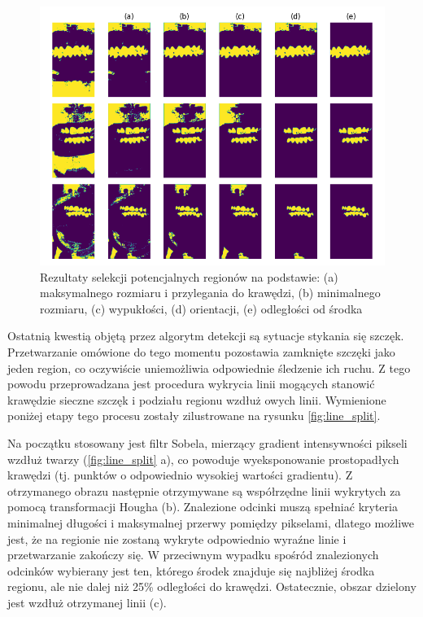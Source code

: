 \begin{figure}
    \centering \includegraphics[width=140mm]{figures/selection.png}
    \caption{Rezultaty selekcji potencjalnych regionów na podstawie: (a) maksymalnego rozmiaru i przylegania do krawędzi, (b) minimalnego rozmiaru, (c) wypukłości, (d) orientacji, (e) odległości od środka}
    \label{fig:selection}
\end{figure}

Ostatnią kwestią objętą przez algorytm detekcji są sytuacje stykania się szczęk. Przetwarzanie omówione do tego momentu pozostawia zamknięte szczęki jako jeden region, co oczywiście uniemożliwia odpowiednie śledzenie ich ruchu. Z tego powodu przeprowadzana jest procedura wykrycia linii mogących stanowić krawędzie sieczne szczęk i podziału regionu wzdłuż owych linii. Wymienione poniżej etapy tego procesu zostały zilustrowane na rysunku \ref{fig:line_split}.

Na początku stosowany jest filtr Sobela, mierzący gradient intensywności pikseli wzdłuż twarzy (\ref{fig:line_split} a), co powoduje wyeksponowanie prostopadłych krawędzi (tj. punktów o odpowiednio wysokiej wartości gradientu). Z otrzymanego obrazu następnie otrzymywane są współrzędne linii wykrytych za pomocą transformacji Hougha (b). Znalezione odcinki muszą spełniać kryteria minimalnej długości i maksymalnej przerwy pomiędzy pikselami, dlatego możliwe jest, że na regionie nie zostaną wykryte odpowiednio wyraźne linie i przetwarzanie zakończy się. W przeciwnym wypadku spośród znalezionych odcinków wybierany jest ten, którego środek znajduje się najbliżej środka regionu, ale nie dalej niż 25\% odległości do krawędzi. Ostatecznie, obszar dzielony jest wzdłuż otrzymanej linii (c).

